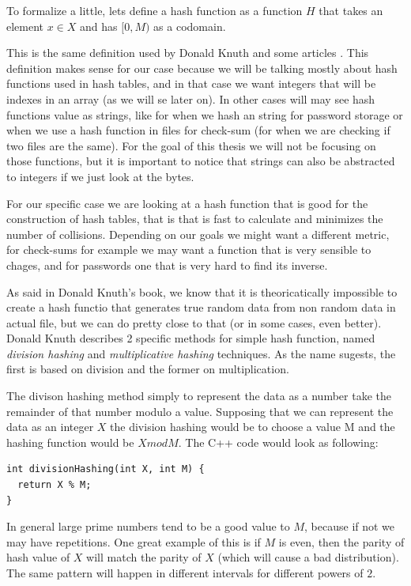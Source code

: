 \bigskip

To formalize a little, lets define a hash function as a function \( H \) that takes an element \( x \in X \) and has \( [0, M) \) as a codomain.

This is the same definition used by Donald Knuth \cite{TAOCP3} and some articles \cite{RobinHoodHashing}. This definition makes sense for our case because we will be talking mostly about hash functions used in hash tables, and in that case we want integers that will be indexes in an array (as we will se later on). In other cases will may see hash functions value as strings, like for when we hash an string for password storage or when we use a hash function in files for check-sum (for when we are checking if two files are the same). For the goal of this thesis we will not be focusing on those functions, but it is important to notice that strings can also be abstracted to integers if we just look at the bytes.

For our specific case we are looking at a hash function that is good for the construction of hash tables, that is that is fast to calculate and minimizes the number of collisions. Depending on our goals we might want a different metric, for check-sums for example we may want a function that is very sensible to chages, and for passwords one that is very hard to find its inverse.

As said in Donald Knuth's book, we know that it is theoricatically impossible to create a hash functio that generates true random data from non random data in actual file, but we can do pretty close to that (or in some cases, even better).  Donald Knuth describes 2 specific methods for simple hash function, named \textit{division hashing} and \textit{multiplicative hashing} techniques. As the name sugests, the first is based on division and the former on multiplication.

The divison hashing method simply to represent the data as a number take the remainder of that number modulo a value. Supposing that we can represent the data as an integer \( X \) the division hashing would be to choose a value M and the hashing function would be \( X mod M \). The C++ code would look as following:

\begin{lstlisting}
int divisionHashing(int X, int M) {
  return X % M;
}
\end{lstlisting}

In general large prime numbers tend to be a good value to \( M \), because if not we may have repetitions. One great example of this is if \( M \) is even, then the parity of hash value of \( X \) will match the parity of \( X \) (which will cause a bad distribution). The same pattern will happen in different intervals for different powers of \( 2 \).

